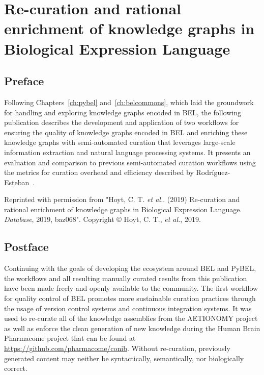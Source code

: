 \chapter{Re-curation and rational enrichment of knowledge graphs in Biological Expression Language}
\label{ch:recuration}

\section*{Preface}

Following Chapters~\ref{ch:pybel} and~\ref{ch:belcommons}, which laid the groundwork for handling and exploring knowledge graphs encoded in \ac{BEL}, the following publication describes the development and application of two workflows for ensuring the quality of knowledge graphs encoded in \ac{BEL} and enriching these knowledge graphs with semi-automated curation that leverages large-scale information extraction and natural language processing systems.
It presents an evaluation and comparison to previous semi-automated curation workflows using the metrics for curation overhead and efficiency described by Rodr\'{i}guez-Esteban~\cite{Rodriguez-Esteban2015}.

\vspace*{\fill}

Reprinted with permission from "Hoyt, C. T. \textit{et al.}. (2019) Re-curation and rational enrichment of knowledge graphs in Biological Expression Language. \textit{Database}, 2019, baz068".
Copyright © Hoyt, C. T., \textit{et al.}, 2019.



\section*{Postface}

Continuing with the goals of developing the ecosystem around \ac{BEL} and PyBEL, the workflows and all resulting manually curated results from this publication have been made freely and openly available to the community.
The first workflow for quality control of \ac{BEL} promotes more sustainable curation practices through the usage of version control systems and continuous integration systems.
It was used to re-curate all of the knowledge assemblies from the AETIONOMY project as well as enforce the clean generation of new knowledge during the Human Brain Pharmacome project that can be found at \url{https://github.com/pharmacome/conib}.
Without re-curation, previously generated content may neither be syntactically, semantically, nor biologically correct.

